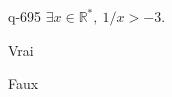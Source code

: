 \begin{truefalse}{q-695}
$\exists x \in \mathbb R^*,\: 1/x>-3$.
\item* Vrai
\item Faux
\end{truefalse}

